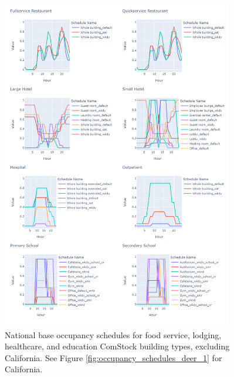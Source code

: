 \begin{figure}
    \centering \includegraphics[trim={0 0 0 0}, clip,  %
    width=0.9\textwidth]{figures/occupancy_schedules_1.png}
    \caption[National base occupancy schedules excluding California]{National base occupancy schedules for food service, lodging, healthcare, and education ComStock building types, excluding California. See Figure \ref{fig:occupancy_schedules_deer_1} for California.}
    \label{fig:occupancy_schedules_1}
\end{figure}

